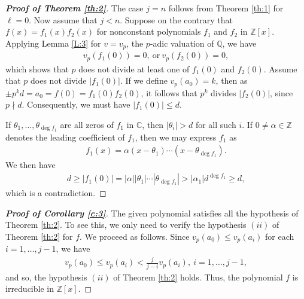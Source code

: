\documentclass[12pt]{amsart}%
\begin{document}
\begin{proof}[\bf Proof of Theorem \ref{th:2}] The case $j=n$ follows from Theorem \ref{th:1} for $\ell=0$. Now assume that $j<n$. Suppose on the contrary that $f(x)=f_1(x)f_2(x)$ for nonconstant polynomials $f_1$ and $f_2$ in $\mathbb{Z}[x]$. Applying Lemma \ref{L:3} for $v=v_p$, the $p$-adic valuation of $\mathbb{Q}$, we have
 \begin{eqnarray}\label{e1}
v_p(f_1(0))=0,~\text{or}~v_p(f_2(0))=0,
 \end{eqnarray}
 which shows that $p$ does not divide at least one of $f_1(0)$ and $f_2(0)$. Assume that $p$ does not divide $|f_1(0)|$. If we define $v_p(a_0)=k$, then as $\pm p^kd=a_0=f(0)=f_1(0)f_2(0)$, it follows that $p^k$ divides $|f_2(0)|$, since $p\nmid d$. Consequently, we must have $|f_1(0)|\leq d$.

If $\theta_1,\ldots, \theta_{\deg f_1}$ are all zeros of $f_1$ in ${\mathbb{C}}$, then $|\theta_i|>d$ for all such $i$. If $0\neq \alpha \in \mathbb{Z}$ denotes the leading coefficient of $f_1$, then we may express $f_1$ as
 \begin{eqnarray*}
f_1(x)=\alpha(x-\theta_1)\cdots (x-\theta_{\deg f_1}).
\end{eqnarray*}
We then have
\begin{eqnarray*}
d\geq |f_1(0)|=|\alpha||\theta_1|\cdots |\theta_{\deg f_1}|>|\alpha_1| d^{\deg f_1}\geq d,
\end{eqnarray*}
which is a contradiction.
\end{proof}
\begin{proof}[\bf Proof of Corollary \ref{c:3}]
The given polynomial satisfies all the hypothesis of Theorem \ref{th:2}. To see this, we only need to verify the hypothesis $(ii)$ of Theorem \ref{th:2} for $f$. We proceed as follows. Since $v_p(a_0)\leq v_p(a_i)$ for each $i=1,\ldots, j-1$, we have \begin{eqnarray*}
v_p(a_0)\leq v_p(a_i)<\frac{j}{j-i}v_p(a_i),~i=1,\ldots, j-1,
\end{eqnarray*}
and so, the hypothesis $(ii)$ of Theorem \ref{th:2} holds. Thus, the polynomial $f$ is irreducible in $\mathbb{Z}[x]$.
\end{proof}
\end{document}
